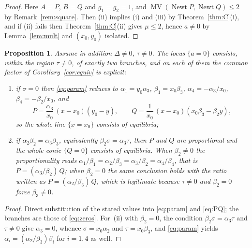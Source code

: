 \documentclass[12pt]{article}
\theoremstyle{plain}
\newtheorem{proposition}[theorem]{Proposition}
\theoremstyle{definition}
\theoremstyle{remark}
\DeclareMathOperator{\MV}{MV}
\DeclareMathOperator{\Newt}{Newt}
\begin{document}
	\begin{proof}
		Here $A=P$, $B=Q$ and $g_{1}=g_{2}=1$, and
		$\MV(\Newt P,\Newt Q)\le2$ by Remark~\ref{rem:square}.  Then (ii)
		implies (i) and (iii) by Theorem~\ref{thm:C}(i), and if (ii) fails then
		Theorem~\ref{thm:C}(ii) gives $\mu\le2$, hence $a\neq0$ by
		Lemma~\ref{lem:mult} and $(x_{0},y_{0})$ isolated.
	\end{proof}
	
	\begin{proposition}\label{prop:branches}
		Assume in addition $\Delta\neq0$, $\tau\neq0$.  The locus $\{a=0\}$
		consists, \emph{within the region $\tau\neq0$}, of exactly two
		branches, and on each of them the common factor
		of Corollary~\ref{cor:equiv} is explicit:
		\begin{enumerate}[label=\rm(\roman*)]
			\item if $\sigma=0$ then \eqref{eq:param} reduces to
			$\alpha_{1}=y_{0}\alpha_{3}$, $\beta_{1}=x_{0}\beta_{3}$,
			$\alpha_{4}=-\alpha_{3}/x_{0}$, $\beta_{4}=-\beta_{2}/x_{0}$, and
			\begin{equation}\label{eq:factor1}
				P=\frac{\alpha_{3}}{x_{0}}\,(x-x_{0})(y_{0}-y),
				\qquad
				Q=\frac{1}{x_{0}}\,(x-x_{0})(x_{0}\beta_{3}-\beta_{2}y),
			\end{equation}
			so the whole line $\{x=x_{0}\}$ consists of equilibria;
			\item if $\alpha_{2}\beta_{2}=\alpha_{3}\beta_{3}$, equivalently
			$\beta_{2}\sigma=\alpha_{3}\tau$, then $P$ and $Q$ are proportional and
			the whole conic $\{Q=0\}$ consists of equilibria.  When $\beta_{2}\neq0$
			the proportionality reads
			$\alpha_{1}/\beta_{1}=\alpha_{2}/\beta_{3}
			=\alpha_{3}/\beta_{2}=\alpha_{4}/\beta_{4}$, that is
			$P=(\alpha_{3}/\beta_{2})\,Q$; when $\beta_{2}=0$ the same conclusion
			holds with the ratio written as $P=(\alpha_{2}/\beta_{3})\,Q$, which is
			legitimate because $\tau\neq0$ and $\beta_{2}=0$ force
			$\beta_{3}\neq0$.
		\end{enumerate}
	\end{proposition}
	
	\begin{proof}
		Direct substitution of the stated values into \eqref{eq:param} and
		\eqref{eq:PQ}; the branches are those of \eqref{eq:zeros}.  For~(ii)
		with $\beta_{2}=0$, the condition $\beta_{2}\sigma=\alpha_{3}\tau$ and
		$\tau\neq0$ give $\alpha_{3}=0$, whence $\sigma=x_{0}\alpha_{2}$ and
		$\tau=x_{0}\beta_{3}$, and \eqref{eq:param} yields
		$\alpha_{i}=(\alpha_{2}/\beta_{3})\beta_{i}$ for $i=1,4$ as well.
	\end{proof}
	
\end{document}
